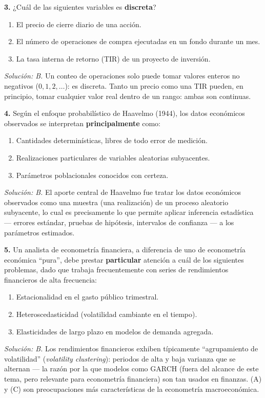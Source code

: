 \documentclass[11pt,a4paper,oneside]{article}
\theoremstyle{definition}
\begin{document}
\begin{cfaBox}
\textbf{3.} ¿Cuál de las siguientes variables es \textbf{discreta}?
\begin{enumerate}[label=\Alph*.]
\item El precio de cierre diario de una acción.
\item El número de operaciones de compra ejecutadas en un fondo durante un mes.
\item La tasa interna de retorno (TIR) de un proyecto de inversión.
\end{enumerate}
\end{cfaBox}
\emph{Solución: B.} Un conteo de operaciones solo puede tomar valores
enteros no negativos ($0,1,2,\dots$): es discreta. Tanto un precio como una
TIR pueden, en principio, tomar cualquier valor real dentro de un rango:
ambas son continuas.

\begin{cfaBox}
\textbf{4.} Según el enfoque probabilístico de Haavelmo (1944), los datos
económicos observados se interpretan \textbf{principalmente} como:
\begin{enumerate}[label=\Alph*.]
\item Cantidades determinísticas, libres de todo error de medición.
\item Realizaciones particulares de variables aleatorias subyacentes.
\item Parámetros poblacionales conocidos con certeza.
\end{enumerate}
\end{cfaBox}
\emph{Solución: B.} El aporte central de Haavelmo fue tratar los datos
económicos observados como una muestra (una realización) de un proceso
aleatorio subyacente, lo cual es precisamente lo que permite aplicar
inferencia estadística --- errores estándar, pruebas de hipótesis,
intervalos de confianza --- a los parámetros estimados.

\begin{cfaBox}
\textbf{5.} Un analista de econometría financiera, a diferencia de uno de
econometría económica ``pura'', debe prestar \textbf{particular} atención a
cuál de los siguientes problemas, dado que trabaja frecuentemente con series
de rendimientos financieros de alta frecuencia:
\begin{enumerate}[label=\Alph*.]
\item Estacionalidad en el gasto público trimestral.
\item Heteroscedasticidad (volatilidad cambiante en el tiempo).
\item Elasticidades de largo plazo en modelos de demanda agregada.
\end{enumerate}
\end{cfaBox}
\emph{Solución: B.} Los rendimientos financieros exhiben típicamente
``agrupamiento de volatilidad'' (\emph{volatility clustering}): periodos de
alta y baja varianza que se alternan --- la razón por la que modelos como
GARCH (fuera del alcance de este tema, pero relevante para econometría
financiera) son tan usados en finanzas. (A) y (C) son preocupaciones más
características de la econometría macroeconómica.
\end{document}

